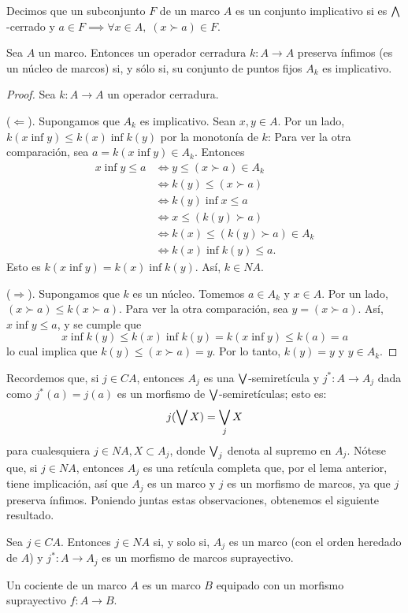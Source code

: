 \begin{defn}
Decimos que un subconjunto $F$ de un marco $A$ es un conjunto
implicativo si es $\bigwedge$-cerrado y
$a\in F \implies  \forall x \in A,\; (x\succ a)\in F$.
\end{defn}
\begin{lemma}
  Sea $A$ un marco. Entonces un operador cerradura $k:A\to A$
  preserva ínfimos (es un núcleo de marcos) si, y
  sólo si, su conjunto de puntos fijos $A_k$ es implicativo.
\end{lemma}
\begin{proof}
Sea $k:A\to A$ un operador cerradura.

($\Leftarrow$). Supongamos que $A_k$ es implicativo.
Sean $x,y \in A$.
Por un lado, $k(x\inf y)\leq k(x)\inf k(y)$ por la monotonía de $k$:
Para ver la otra comparación, sea $a=k(x\inf y)\in A_k$. Entonces
\begin{align*}
    x\inf y\leq a
    & \iff y\leq (x\succ a)\in A_k\\
    &\iff k(y)\leq (x\succ a)\\
    &\iff k(y)\inf x\leq a \\
    &\iff x\leq (k(y)\succ a) \\
    &\iff k(x)\leq (k(y)\succ a)\in A_k \\
    &\iff k(x)\inf k(y) \leq a.
\end{align*}
Esto es $k(x\inf y)=k(x)\inf k(y)$. Así, $k\in NA$.

($\Rightarrow$). Supongamos que $k$ es un núcleo. Tomemos $a\in A_k$ y
$x\in A$.
Por un lado, $(x\succ a)\leq k(x\succ a)$. Para ver la otra
comparación, sea $y=(x\succ a)$.
Así, $x\inf y\leq a$, y se cumple que 
$$x\inf k(y)\leq k(x)\inf k(y) =k(x\inf y)\leq k(a)=a$$
lo cual implica que $k(y)\leq (x\succ a)=y$. Por lo tanto, $k(y)=y$ y
$y\in A_k$.
\end{proof}

Recordemos que, si $j\in CA$, entonces $A_j$ es una $\bigvee$-semiretícula
y $j^*:A\to A_j$ dada como $j^*(a)=j(a)$
es un morfismo de $\bigvee$-semiretículas; esto es:
$$j(\bigvee X)=\bigvee_jX$$
para cualesquiera $j\in NA, X\subset A_j$, donde $\bigvee_j$ denota
al supremo en $A_j$.
Nótese que, si $j\in NA$, entonces $A_j$ es una retícula completa
que, por el lema anterior, tiene implicación, así que $A_j$ es un
marco y $j$ es un morfismo de marcos, ya que $j$ preserva
ínfimos.
Poniendo juntas estas observaciones, obtenemos el siguiente
resultado.
\begin{lemma}
    Sea $j\in CA$.
    Entonces $j\in NA$ si, y solo si,
    $A_j$ es un marco (con el orden heredado de $A$)
    y $j^*:A\to A_j$ es un morfismo de marcos suprayectivo.
\end{lemma}
\begin{defn}
  Un cociente de un marco $A$ es un marco $B$ equipado con un morfismo
  suprayectivo $f:A\to B$.
\end{defn}

